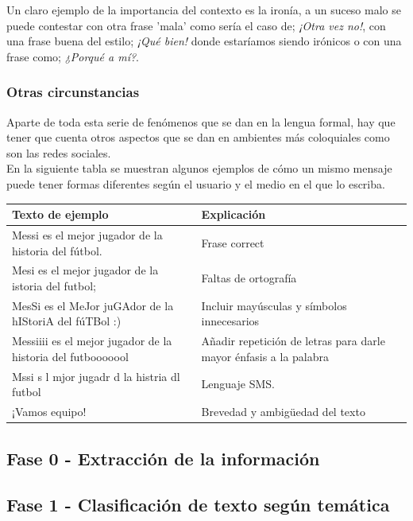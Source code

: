 \documentclass[../all.tex]{subfiles}
\begin{document}
	Un claro ejemplo de la importancia del contexto es la ironía, a un suceso malo se puede contestar con otra frase 'mala' como sería el caso de; \textit{¡Otra vez no!}, con una frase buena del estilo; \textit{¡Qué bien!} donde estaríamos siendo irónicos o con una frase como; \textit{¿Porqué a mí?}.
\newpage
\subsubsection{Otras circunstancias}

	Aparte de toda esta serie de fenómenos que se dan en la lengua formal, hay que tener que cuenta otros aspectos que se dan en ambientes más coloquiales como son las redes sociales.\\
	
	En la siguiente tabla se muestran algunos ejemplos de cómo un mismo mensaje puede tener formas diferentes según el usuario y el medio en el que lo escriba.
	\begin{center}
		\begin{tabular}{ | m{7cm}| m{7cm} | } 
			\hline
			\textbf{Texto de ejemplo} & \textbf{Explicación}\\ 
			\hline
			Messi es el mejor jugador de la historia del fútbol. & Frase correct \\ 
			\hline
			Mesi es el mejor jugador de la istoria del futbol; & Faltas de ortografía\\ 
			\hline
			MesSi es el MeJor juGAdor de la hIStoriA del fúTBol :) & Incluir mayúsculas y símbolos innecesarios\\ 
			\hline
			Messiiii es el mejor jugador de la historia del futbooooool & Añadir repetición de letras para darle mayor énfasis a la palabra\\ 
			\hline
			Mssi s l mjor jugadr d la histria dl futbol  & Lenguaje SMS.\\ 
			\hline
			¡Vamos equipo! & Brevedad y ambigüedad del texto \\ 
			\hline
		\end{tabular}
	\end{center}

\newpage
\subsection{Fase 0 - Extracción de la información}


\newpage
\subsection{Fase 1 - Clasificación de texto según temática}
\end{document}
